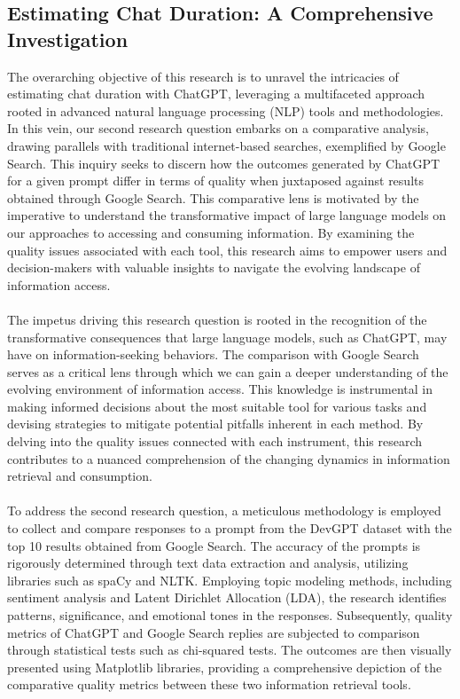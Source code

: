 \documentclass[journal]{IEEEtran}
\begin{document}
\subsection{Estimating Chat Duration: A Comprehensive Investigation}
The overarching objective of this research is to unravel the intricacies of estimating chat duration with ChatGPT, leveraging a multifaceted approach rooted in advanced natural language processing (NLP) tools and methodologies. In this vein, our second research question embarks on a comparative analysis, drawing parallels with traditional internet-based searches, exemplified by Google Search. This inquiry seeks to discern how the outcomes generated by ChatGPT for a given prompt differ in terms of quality when juxtaposed against results obtained through Google Search. This comparative lens is motivated by the imperative to understand the transformative impact of large language models on our approaches to accessing and consuming information. By examining the quality issues associated with each tool, this research aims to empower users and decision-makers with valuable insights to navigate the evolving landscape of information access.\\ \\
The impetus driving this research question is rooted in the recognition of the transformative consequences that large language models, such as ChatGPT, may have on information-seeking behaviors. The comparison with Google Search serves as a critical lens through which we can gain a deeper understanding of the evolving environment of information access. This knowledge is instrumental in making informed decisions about the most suitable tool for various tasks and devising strategies to mitigate potential pitfalls inherent in each method. By delving into the quality issues connected with each instrument, this research contributes to a nuanced comprehension of the changing dynamics in information retrieval and consumption.\\ \\
To address the second research question, a meticulous methodology is employed to collect and compare responses to a prompt from the DevGPT dataset with the top 10 results obtained from Google Search. The accuracy of the prompts is rigorously determined through text data extraction and analysis, utilizing libraries such as spaCy and NLTK. Employing topic modeling methods, including sentiment analysis and Latent Dirichlet Allocation (LDA), the research identifies patterns, significance, and emotional tones in the responses. Subsequently, quality metrics of ChatGPT and Google Search replies are subjected to comparison through statistical tests such as chi-squared tests. The outcomes are then visually presented using Matplotlib libraries, providing a comprehensive depiction of the comparative quality metrics between these two information retrieval tools.
\end{document}

